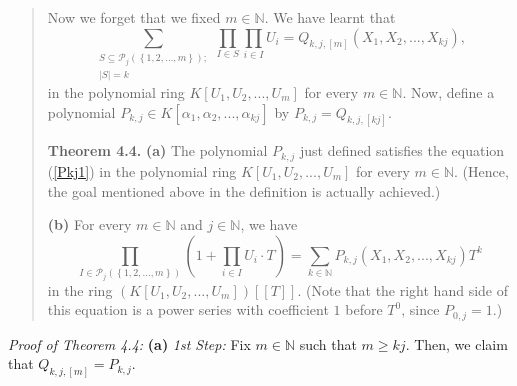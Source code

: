 \documentclass[12pt,final,notitlepage,onecolumn,german]{article}%
\begin{document}
\begin{quote}
Now we forget that we fixed $m\in\mathbb{N}$. We have learnt that%
\[
\sum_{\substack{S\subseteq\mathcal{P}_{j}\left(  \left\{  1,2,...,m\right\}
\right)  ;\\\left\vert S\right\vert =k}}\prod_{I\in S}\prod_{i\in I}%
U_{i}=Q_{k,j,\left[  m\right]  }\left(  X_{1},X_{2},...,X_{kj}\right)  ,
\]
in the polynomial ring $K\left[  U_{1},U_{2},...,U_{m}\right]  $ for every
$m\in\mathbb{N}$. Now, define a polynomial $P_{k,j}\in K\left[  \alpha
_{1},\alpha_{2},...,\alpha_{kj}\right]  $ by $P_{k,j}=Q_{k,j,\left[
kj\right]  }.$

\textbf{Theorem 4.4.} \textbf{(a)} The polynomial $P_{k,j}$ just defined
satisfies the equation (\ref{Pkj1}) in the polynomial ring $K\left[
U_{1},U_{2},...,U_{m}\right]  $ for every $m\in\mathbb{N}$. (Hence, the goal
mentioned above in the definition is actually achieved.)

\textbf{(b)} For every $m\in\mathbb{N}$ and $j\in\mathbb{N}$, we have%
\begin{equation}
\prod_{I\in\mathcal{P}_{j}\left(  \left\{  1,2,...,m\right\}  \right)
}\left(  1+\prod_{i\in I}U_{i}\cdot T\right)  =\sum_{k\in\mathbb{N}}%
P_{k,j}\left(  X_{1},X_{2},...,X_{kj}\right)  T^{k} \label{Pkj2}%
\end{equation}
in the ring $\left(  K\left[  U_{1},U_{2},...,U_{m}\right]  \right)  \left[
\left[  T\right]  \right]  $. (Note that the right hand side of this equation
is a power series with coefficient $1$ before $T^{0}$, since $P_{0,j}=1$.)
\end{quote}

\textit{Proof of Theorem 4.4:} \textbf{(a)} \textit{1st Step:} Fix
$m\in\mathbb{N}$ such that $m\geq kj$. Then, we claim that $Q_{k,j,\left[
m\right]  }=P_{k,j}$.
\end{document}

